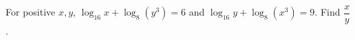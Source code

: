 For positive $x,y$, $\log_{16}x+\log_8(y^3)=6$ and $\log_{16}y+\log_8(x^3)=9$. Find $\dfrac{x}{y}$.
